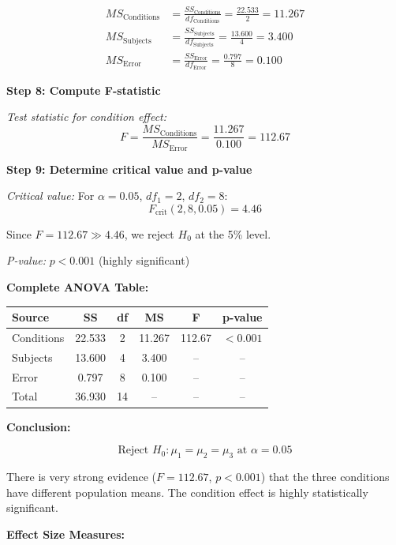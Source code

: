 \documentclass[12pt]{article}
\begin{document}
\begin{solution}
\begin{align*}
MS_{\text{Conditions}} &= \frac{SS_{\text{Conditions}}}{df_{\text{Conditions}}} = \frac{22.533}{2} = 11.267 \\
MS_{\text{Subjects}} &= \frac{SS_{\text{Subjects}}}{df_{\text{Subjects}}} = \frac{13.600}{4} = 3.400 \\
MS_{\text{Error}} &= \frac{SS_{\text{Error}}}{df_{\text{Error}}} = \frac{0.797}{8} = 0.100
\end{align*}

\textbf{Step 8: Compute F-statistic}

\textit{Test statistic for condition effect:}
\[
F = \frac{MS_{\text{Conditions}}}{MS_{\text{Error}}} = \frac{11.267}{0.100} = 112.67
\]


\textbf{Step 9: Determine critical value and p-value}

\textit{Critical value:} For $\alpha = 0.05$, $df_1 = 2$, $df_2 = 8$:
\[
F_{\text{crit}}(2, 8, 0.05) = 4.46
\]

Since $F = 112.67 \gg 4.46$, we reject $H_0$ at the 5\% level.

\textit{P-value:} $p < 0.001$ (highly significant)

\textbf{Complete ANOVA Table:}

\begin{center}
\begin{tabular}{|l|c|c|c|c|c|}
\hline
\textbf{Source} & \textbf{SS} & \textbf{df} & \textbf{MS} & \textbf{F} & \textbf{p-value} \\
\hline
Conditions & 22.533 & 2 & 11.267 & 112.67 & $< 0.001$ \\
Subjects & 13.600 & 4 & 3.400 & -- & -- \\
Error & 0.797 & 8 & 0.100 & -- & -- \\
\hline
Total & 36.930 & 14 & -- & -- & -- \\
\hline
\end{tabular}
\end{center}

\textbf{Conclusion:}

\[
\boxed{\text{Reject } H_0: \mu_1 = \mu_2 = \mu_3 \text{ at } \alpha = 0.05}
\]

There is very strong evidence ($F = 112.67$, $p < 0.001$) that the three conditions have different population means. The condition effect is highly statistically significant.

\textbf{Effect Size Measures:}


\end{solution}
\end{document}
